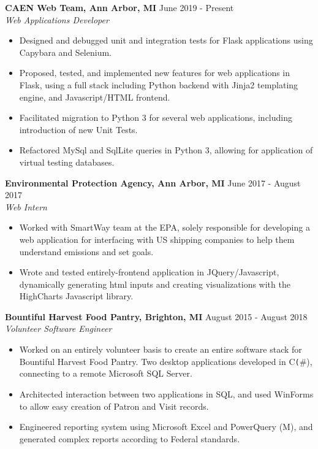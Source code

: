 \documentclass[overlapped]{res}
\begin{document}
\begin{resume}
    \textbf{CAEN Web Team, Ann Arbor, MI}
    \hfill June 2019 - Present \\
    {\sl Web Applications Developer}
    \begin{itemize}  \itemsep -2pt %
        \item Designed and debugged unit and integration tests for Flask applications using Capybara and Selenium.
        \item Proposed, tested, and implemented new features for web applications in Flask, using a full stack including Python backend with Jinja2 templating engine, and Javascript/HTML frontend.
        \item Facilitated migration to Python 3 for several web applications, including introduction of new Unit Tests.
        \item Refactored MySql and SqlLite queries in Python 3, allowing for application of virtual testing databases.

    \end{itemize}

    \textbf{Environmental Protection Agency, Ann Arbor, MI}
    \hfill June 2017 - August 2017 \\
    {\sl Web Intern}
    \begin{itemize}  \itemsep -2pt %
        \item Worked with SmartWay team at the EPA, solely responsible for developing a web application for interfacing with US shipping companies to help them understand emissions and set goals.
        \item Wrote and tested entirely-frontend application in JQuery/Javascript, dynamically generating html inputs and creating visualizations with the HighCharts Javascript library.

    \end{itemize}

    \textbf{Bountiful Harvest Food Pantry, Brighton, MI}
    \hfill August 2015 - August 2018 \\
    {\sl Volunteer Software Engineer}
    \begin{itemize}  \itemsep -2pt %
        \item Worked on an entirely volunteer basis to create an entire software stack for Bountiful Harvest Food Pantry. Two desktop applications developed in C\texttt(\#), connecting to a remote Microsoft SQL Server.
        \item Architected interaction between two applications in SQL, and used WinForms to allow easy creation of Patron and Visit records.
        \item Engineered reporting system using Microsoft Excel and PowerQuery (M), and generated complex reports according to Federal standards.
    \end{itemize}


\end{resume}
\end{document}
